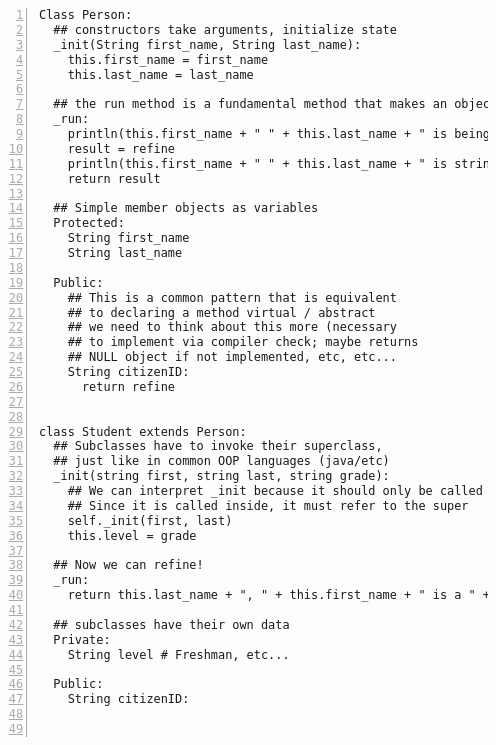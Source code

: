 \documentclass[10pt]{article}
\begin{document}
\begin{lstlisting}[numbers=left,label=The All-mighty Pattern,caption=The All-mighty Pattern]
Class Person:
  ## constructors take arguments, initialize state
  _init(String first_name, String last_name):
    this.first_name = first_name
    this.last_name = last_name

  ## the run method is a fundamental method that makes an object callable
  _run:
    println(this.first_name + " " + this.last_name + " is being stringified!")
    result = refine
    println(this.first_name + " " + this.last_name + " is strinfigied into " + result + "!")
    return result

  ## Simple member objects as variables
  Protected:
    String first_name
    String last_name

  Public:
    ## This is a common pattern that is equivalent
    ## to declaring a method virtual / abstract
    ## we need to think about this more (necessary
    ## to implement via compiler check; maybe returns
    ## NULL object if not implemented, etc, etc...
    String citizenID:
      return refine


class Student extends Person:
  ## Subclasses have to invoke their superclass,
  ## just like in common OOP languages (java/etc)
  _init(string first, string last, string grade):
    ## We can interpret _init because it should only be called through the Person() construction.
    ## Since it is called inside, it must refer to the super
    self._init(first, last)
    this.level = grade

  ## Now we can refine!
  _run:
    return this.last_name + ", " + this.first_name + " is a " + this.level
    
  ## subclasses have their own data
  Private:
    String level # Freshman, etc...

  Public:
    String citizenID:
      
  
\end{lstlisting}
\end{document}
